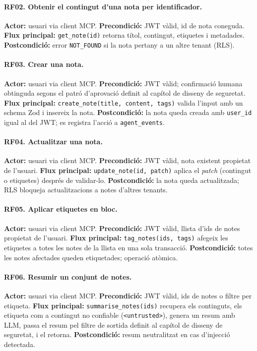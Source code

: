 \paragraph{RF02. Obtenir el contingut d'una nota per identificador.}
\textbf{Actor:} usuari via client MCP.
\textbf{Precondició:} JWT vàlid, id de nota coneguda.
\textbf{Flux principal:} \texttt{get\_note(id)} retorna títol, contingut,
etiquetes i metadades.
\textbf{Postcondició:} error \texttt{NOT\_FOUND} si la nota pertany a un
altre tenant (RLS).

\paragraph{RF03. Crear una nota.}
\textbf{Actor:} usuari via client MCP.
\textbf{Precondició:} JWT vàlid; confirmació humana obtinguda segons
el patró d'aprovació definit al capítol de disseny de seguretat.
\textbf{Flux principal:} \texttt{create\_note(title, content, tags)}
valida l'input amb un schema Zod i insereix la nota.
\textbf{Postcondició:} la nota queda creada amb \texttt{user\_id} igual
al del JWT; es registra l'acció a \texttt{agent\_events}.

\paragraph{RF04. Actualitzar una nota.}
\textbf{Actor:} usuari via client MCP.
\textbf{Precondició:} JWT vàlid, nota existent propietat de l'usuari.
\textbf{Flux principal:} \texttt{update\_note(id, patch)} aplica el
\emph{patch} (contingut o etiquetes) després de validar-lo.
\textbf{Postcondició:} la nota queda actualitzada; RLS bloqueja
actualitzacions a notes d'altres tenants.

\paragraph{RF05. Aplicar etiquetes en bloc.}
\textbf{Actor:} usuari via client MCP.
\textbf{Precondició:} JWT vàlid, llista d'ids de notes propietat de
l'usuari.
\textbf{Flux principal:} \texttt{tag\_notes(ids, tags)} afegeix les
etiquetes a totes les notes de la llista en una sola transacció.
\textbf{Postcondició:} totes les notes afectades queden etiquetades;
operació atòmica.

\paragraph{RF06. Resumir un conjunt de notes.}
\textbf{Actor:} usuari via client MCP.
\textbf{Precondició:} JWT vàlid, ids de notes o filtre per etiqueta.
\textbf{Flux principal:} \texttt{summarise\_notes(ids)} recupera els
continguts, els etiqueta com a contingut no confiable
(\texttt{<untrusted>}), genera un resum amb LLM, passa el resum pel
filtre de sortida definit al capítol de disseny de seguretat, i el
retorna.
\textbf{Postcondició:} resum neutralitzat en cas d'injecció detectada.

